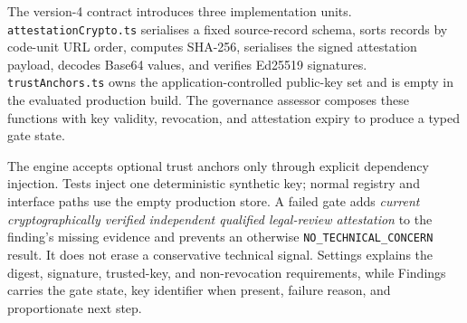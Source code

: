 The version-4 contract introduces three implementation units. \texttt{attestationCrypto.ts} serialises a fixed source-record schema, sorts records by code-unit URL order, computes SHA-256, serialises the signed attestation payload, decodes Base64 values, and verifies Ed25519 signatures. \texttt{trustAnchors.ts} owns the application-controlled public-key set and is empty in the evaluated production build. The governance assessor composes these functions with key validity, revocation, and attestation expiry to produce a typed gate state.

The engine accepts optional trust anchors only through explicit dependency injection. Tests inject one deterministic synthetic key; normal registry and interface paths use the empty production store. A failed gate adds \emph{current cryptographically verified independent qualified legal-review attestation} to the finding's missing evidence and prevents an otherwise \texttt{NO\_TECHNICAL\_CONCERN} result. It does not erase a conservative technical signal. Settings explains the digest, signature, trusted-key, and non-revocation requirements, while Findings carries the gate state, key identifier when present, failure reason, and proportionate next step.
